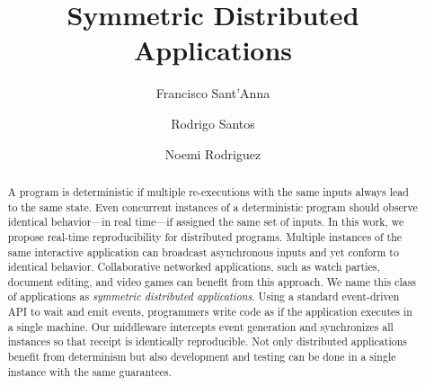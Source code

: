 \documentclass[sigplan,screen]{acmart}
\begin{document}
\title{Symmetric Distributed Applications}

\author{Francisco Sant'Anna}

\author{Rodrigo Santos}

\author{Noemi Rodriguez}


\begin{abstract}
A program is deterministic if multiple re-executions with the same inputs
always lead to the same state.
Even concurrent instances of a deterministic program should observe identical
behavior---in real time---if assigned the same set of inputs.
%
In this work, we propose real-time reproducibility for distributed programs.
Multiple instances of the same interactive application can broadcast
asynchronous inputs and yet conform to identical behavior.
Collaborative networked applications, such as watch parties, document editing,
and video games can benefit from this approach.
We name this class of applications as \emph{symmetric distributed applications}.
%
Using a standard event-driven API to wait and emit events, programmers write
code as if the application executes in a single machine.
Our middleware intercepts event generation and synchronizes all instances so
that receipt is identically reproducible.
Not only distributed applications benefit from determinism but also development
and testing can be done in a single instance with the same guarantees.
\end{abstract}

\maketitle
\end{document}
